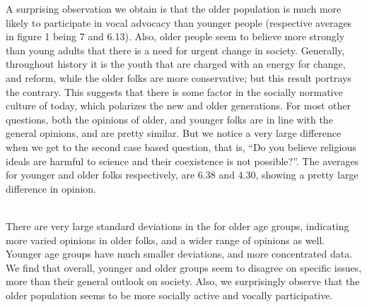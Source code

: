 \documentclass{article}
\begin{document}
A surprising observation we obtain is that the older population is much more likely to participate in vocal advocacy than younger people (respective averages in figure 1 being 7 and 6.13). Also, older people seem to believe more strongly than young adults that there is a need for urgent change in society. Generally, throughout history it is the youth that are charged with an energy for change, and reform, while the older folks are more conservative; but this result portrays the contrary. This suggests that there is some factor in the socially normative culture of today, which polarizes the new and older generations.
For most other questions, both the opinions of older, and younger folks are in line with the general opinions, and are pretty similar. But we notice a very large difference when we get to the second case based question, that is, “Do you believe religious ideals are harmful to science and their coexistence is not possible?”. The averages for younger and older folks respectively, are 6.38 and 4.30, showing a pretty large difference in opinion. \\ \\

There are very large standard deviations in the for older age groups, indicating more varied opinions in older folks, and a wider range of opinions as well. Younger age groups have much smaller deviations, and more concentrated data.
We find that overall, younger and older groups seem to disagree on specific issues, more than their general outlook on society. Also, we surprisingly observe that the older population seems to be more socially active and vocally participative.
\end{document}
